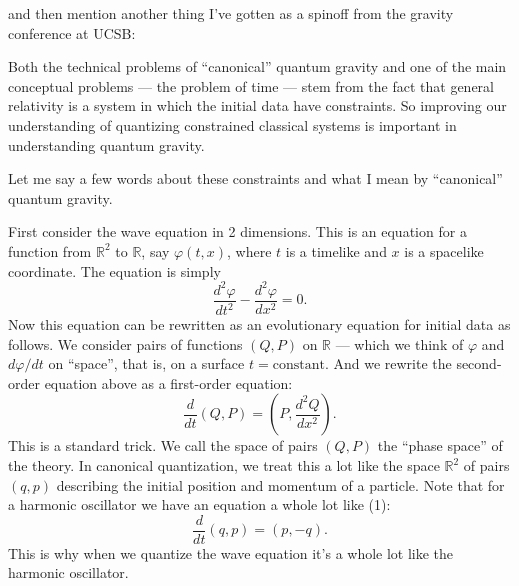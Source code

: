 \documentclass{article}
\def\tightlist{}
\renewcommand{\texttt}[1]{%
  \begingroup
  \ttfamily
  \begingroup\lccode`~=`/\lowercase{\endgroup\def~}{/\discretionary{}{}{}}%
  \begingroup\lccode`~=`[\lowercase{\endgroup\def~}{[\discretionary{}{}{}}%
  \begingroup\lccode`~=`.\lowercase{\endgroup\def~}{.\discretionary{}{}{}}%
  \catcode`/=\active\catcode`[=\active\catcode`.=\active
  \scantokens{#1\noexpand}%
  \endgroup
}
\begin{document}
\noindent
and then mention another thing I've gotten as a spinoff from the gravity
conference at UCSB:


Both the technical problems of ``canonical'' quantum gravity and one of
the main conceptual problems --- the problem of time --- stem from the
fact that general relativity is a system in which the initial data have
constraints. So improving our understanding of quantizing constrained
classical systems is important in understanding quantum gravity.

Let me say a few words about these constraints and what I mean by
``canonical'' quantum gravity.

First consider the wave equation in 2 dimensions. This is an equation
for a function from \(\mathbb{R}^2\) to \(\mathbb{R}\), say
\(\varphi(t,x)\), where \(t\) is a timelike and \(x\) is a spacelike
coordinate. The equation is simply
\[\frac{d^2\varphi}{dt^2} -\frac{d^2\varphi}{dx^2} = 0.\] Now this
equation can be rewritten as an evolutionary equation for initial data
as follows. We consider pairs of functions \((Q,P)\) on \(\mathbb{R}\)
--- which we think of \(\varphi\) and \(d\varphi/dt\) on ``space'', that
is, on a surface \(t = \text{constant}\). And we rewrite the
second-order equation above as a first-order equation:
\[\frac{d}{dt}(Q,P) = \left(P,\frac{d^2Q}{dx^2}\right).\tag{1}\] This is
a standard trick. We call the space of pairs \((Q,P)\) the ``phase
space'' of the theory. In canonical quantization, we treat this a lot
like the space \(\mathbb{R}^2\) of pairs \((q,p)\) describing the
initial position and momentum of a particle. Note that for a harmonic
oscillator we have an equation a whole lot like (1):
\[\frac{d}{dt}(q,p) = (p,-q).\] This is why when we quantize the wave
equation it's a whole lot like the harmonic oscillator.
\end{document}
